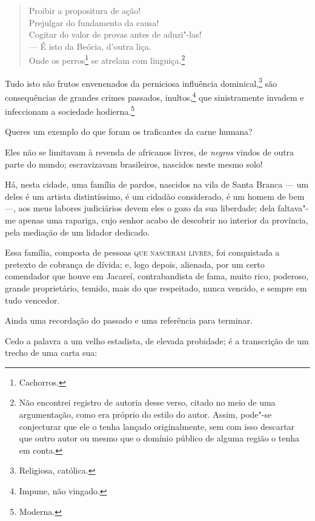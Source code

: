 \begin{verse}
Proibir a propositura de ação!\\
Prejulgar do fundamento da causa!\\
Cogitar do valor de provas antes de aduzi"-las!\\
--- É isto da Beócia, d'outra liça.\\
Onde os perros\footnote{Cachorros.} se atrelam com linguiça.\footnote{
  Não encontrei registro de autoria desse verso, citado no meio de uma
  argumentação, como era próprio do estilo do autor. Assim, pode"-se
  conjecturar que ele o tenha lançado originalmente, sem com isso
  descartar que outro autor ou mesmo que o domínio público de alguma
  região o tenha em conta.}
\end{verse}  

Tudo isto são frutos envenenados da perniciosa influência
dominical,\footnote{Religiosa, católica.} são consequências de grandes
crimes passados, inultos,\footnote{Impune, não vingado.} que
sinistramente invadem e infeccionam a sociedade hodierna.\footnote{
  Moderna.}

Queres um exemplo do que foram os traficantes da carne humana?

Eles não se limitavam à revenda de africanos livres, de \emph{negros}
vindos de outra parte do mundo; escravizavam brasileiros, nascidos neste
mesmo solo!

Há, nesta cidade, uma família de pardos, nascidos na vila de Santa
Branca --- um deles é um artista distintíssimo, é um cidadão
considerado, é um homem de bem ---, aos meus labores judiciários devem
eles o gozo da sua liberdade; dela faltava"-me apenas uma rapariga, cujo
senhor acabo de descobrir no interior da província, pela mediação de um
lidador dedicado.

Essa família, composta de pessoas \textsc{que nasceram livres}, foi conquistada a
pretexto de cobrança de dívida; e, logo depois, alienada, por um certo
comendador que houve em Jacareí, contrabandista de fama, muito rico,
poderoso, grande proprietário, temido, mais do que respeitado, nunca
vencido, e sempre em tudo vencedor.

Ainda uma recordação do passado e uma referência para terminar.

Cedo a palavra a um velho estadista, de elevada probidade; é a
transcrição de um trecho de uma carta sua:

